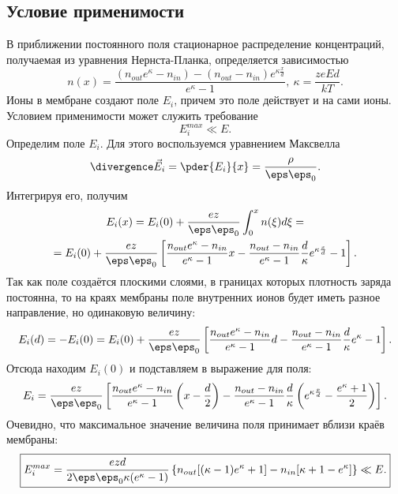 \documentclass{hedwork}
\begin{document}
\subsection{Условие применимости}
    В приближении постоянного поля стационарное распределение концентраций,
    получаемая из уравнения Нернста-Планка, определяется зависимостью
    \[
        n(x) = \frac{(n_{out}e^\kappa - n_{in}) - (n_{out} -
        n_{in})e^{\kappa\frac{x}{d}}}{e^\kappa - 1},\ \kappa = \frac{zeEd}{kT}.
    \]
    Ионы в мембране создают поле \( E_i \), причем это поле действует и на
    сами ионы. Условием применимости может служить требование
    \[
        E_i^{max} \ll E.
    \]
    Определим поле \( E_i \). Для этого воспользуемся уравнением Максвелла
    \[
        \divergence\vec{E}_i = \pder{E_i}{x} = \frac{\rho}{\eps\eps_0}.
    \]
    Интегрируя его, получим
    \begin{gather}
        E_i(x) = E_i(0) + \frac{ez}{\eps\eps_0}\int_0^x n(\xi)d\xi = \nonumber\\
        = E_i(0) + \frac{ez}{\eps\eps_0}\left[
        \frac{n_{out}e^\kappa - n_{in}}{e^\kappa - 1}x - \frac{n_{out} -
        n_{in}}{e^\kappa - 1}\frac{d}{\kappa}{e^{\kappa\frac{x}{d}} - 1}
        \right].
    \end{gather}
    Так как поле создаётся плоскими слоями, в границах которых плотность заряда
    постоянна, то на краях мембраны поле внутренних ионов будет иметь разное
    направление, но одинаковую величину:
    \begin{equation}
        E_i(d) = -E_i(0) = E_i(0) + \frac{ez}{\eps\eps_0}\left[
        \frac{n_{out}e^\kappa - n_{in}}{e^\kappa - 1}d - \frac{n_{out} -
        n_{in}}{e^\kappa - 1}\frac{d}{\kappa}{e^\kappa - 1}
        \right].
    \end{equation}
    Отсюда находим \( E_i(0) \) и подставляем в выражение для поля:
    \begin{equation}
        E_i = \frac{ez}{\eps\eps_0}\left[
        \frac{n_{out}e^\kappa - n_{in}}{e^\kappa - 1}\left(x-\frac{d}{2}\right)
        - \frac{n_{out} - n_{in}}{e^\kappa - 1}\frac{d}{\kappa}
        \left(e^{\kappa\frac{x}{d}} - \frac{e^\kappa + 1}{2}\right)
        \right].
    \end{equation}
    Очевидно, что максимальное значение величина поля принимает вблизи краёв
    мембраны:
    \begin{equation}
        \boxed{
        E_i^{max} = \frac{ezd}{2\eps\eps_0\kappa(e^\kappa - 1)}\left\{
            n_{out}[(\kappa - 1)e^\kappa + 1] - n_{in}[\kappa + 1 - e^\kappa]
        \right\} \ll E.}
    \end{equation}
\end{document}

